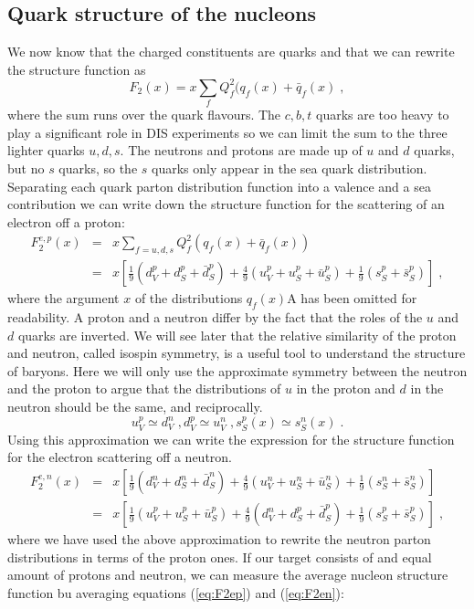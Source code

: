 \documentclass[12pt]{article}
\begin{document}
\subsection{Quark structure of the nucleons}
We now know that the charged constituents are quarks and that we can rewrite the structure function as 
\[F_2(x)=x\sum\limits_{f}Q_f^2(q_f(x)+\bar q_f(x)\;,\]
where the sum runs over the quark flavours. The $c,b,t$ quarks are too heavy to play a significant role in DIS experiments so we can limit the sum to the three lighter quarks $u,d,s$. The neutrons and protons are made up of $u$ and $d$ quarks, but no $s$ quarks, so the $s$ quarks only appear in the sea quark distribution. Separating each quark parton distribution function into a valence and a sea contribution we can write down the structure function for the scattering of an electron off a proton:
\begin{eqnarray*}\label{eq:F2ep}
F_2^{e,p}(x)&=&x\sum\limits_{f=u,d,s}Q_f^2(q_f(x)+\bar q_f(x))\\
&=&x\left[
\frac{1}{9}\left(d_V^p+d_S^{p}+\bar d_S^p\right)+
\frac{4}{9}\left(u_V^p+u_S^{p}+\bar u_S^p\right)+
\frac{1}{9}\left(s_S^{p}+\bar s_S^p\right)
\right]\;,
\end{eqnarray*}
where the argument $x$ of the distributions $q_f(x)$A has been omitted for readability. A proton and a neutron differ by the fact that the roles of the $u$ and $d$ quarks are inverted. We will see later that the relative similarity of the proton and neutron, called isospin symmetry, is a useful tool to understand the structure of baryons. Here we will only use the approximate symmetry between the neutron and the proton to argue that the distributions of $u$ in the proton and $d$ in the neutron should be the same, and reciprocally.
\[u_V^p\simeq d_V^n\;, d_V^p\simeq u_V^n\;, s_S^p(x)\simeq s_S^{n}(x)\;.\] 
Using this approximation we can write the expression for the structure function for the electron scattering off a neutron.  
\begin{eqnarray*}\label{eq:F2en}
F_2^{e,n}(x)&=&x\left[
\frac{1}{9}\left(d_V^n+d_S^{n}+\bar d_S^n\right)+
\frac{4}{9}\left(u_V^n+u_S^{n}+\bar u_S^n\right)+
\frac{1}{9}\left(s_S^{n}+\bar s_S^n\right)
\right]\\
&=&x
\left[
\frac{1}{9}\left(u_V^p+u_S^{p}+\bar u_S^p\right)+
\frac{4}{9}\left(d_V^n+d_S^{p}+\bar d_S^p\right)+
\frac{1}{9}\left(s_S^{p}+\bar s_S^p\right)
\right]\;,
\end{eqnarray*}
where we have used the above approximation to rewrite the neutron parton distributions in terms of the proton ones. If our target consists of and equal amount of protons and neutron, we can measure the average nucleon structure function bu averaging equations (\ref{eq:F2ep}) and (\ref{eq:F2en}):
\end{document}
